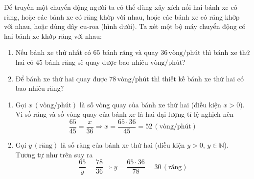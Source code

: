 \begin{bt}%
Để truyền một  chuyển động người ta có thể dùng xây xích nối hai bánh xe có răng, hoặc các bánh xe có răng khớp với nhau, hoặc các bánh xe có răng khớp với nhau, hoặc dùng dây cu-roa (hình dưới). Ta xét một bộ máy chuyển động có hai bánh xe khớp răng với nhau:
\begin{enumerate}
	\item Nếu bánh xe thứ nhất có $65$ bánh răng và quay $36\, \mathrm{\text{vòng}}/\mathrm{\text{phút}}$ thì bánh xe thứ hai có $45$ bánh răng sẽ quay được bao nhiêu $ \mathrm{\text{vòng}}/\mathrm{\text{phút}}$? 
	\item  Để bánh xe thứ hai quay được $78\, \mathrm{\text{vòng}}/\mathrm{\text{phút}}$ thì thiết kế bánh xe thứ hai có bao nhiêu răng?
\end{enumerate}
	\loigiai
	{\begin{enumerate}
			\item Gọi  $x\, \left(\mathrm{\text{vòng}}/\mathrm{\text{phút}}\right)$ là số vòng quay của bánh xe thứ hai (điều kiện $x > 0$).\\
			Vì số răng và số vòng quay của bánh xe là hai đại lượng tỉ lệ nghịch nên
			  $$\dfrac{65}{45}= \dfrac{x}{36}\Rightarrow x = \dfrac{65\cdot 36}{45} = 52\, \left(\mathrm{\text{vòng}}/\mathrm{\text{phút}}\right)$$
		\item  Gọi $y\, \left(\mathrm{\text{răng}}\right)$ là số răng của bánh xe thứ hai (điều kiện $y > 0$, $y\in\mathbb{N}$).\\
		 Tương tự như trên suy ra 
		$$\dfrac{65}{y}= \dfrac{78}{36}\Rightarrow y = \dfrac{65\cdot 36}{78} = 30\, \left(\mathrm{\text{răng}}\right)$$
		\end{enumerate}
	}		
\end{bt}



